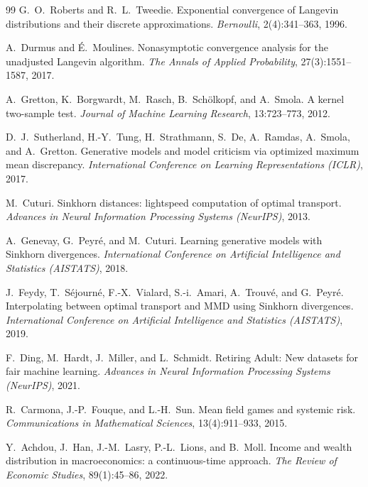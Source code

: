 \documentclass[11pt, a4paper]{article}
\theoremstyle{definition}
\begin{document}
\begin{thebibliography}{99}
G.~O.~Roberts and R.~L.~Tweedie.
\newblock Exponential convergence of Langevin distributions and their
discrete approximations.
\newblock \emph{Bernoulli}, 2(4):341--363, 1996.

A.~Durmus and \'E.~Moulines.
\newblock Nonasymptotic convergence analysis for the unadjusted Langevin
algorithm.
\newblock \emph{The Annals of Applied Probability}, 27(3):1551--1587,
2017.

A.~Gretton, K.~Borgwardt, M.~Rasch, B.~Sch\"olkopf, and A.~Smola.
\newblock A kernel two-sample test.
\newblock \emph{Journal of Machine Learning Research}, 13:723--773, 2012.

D.~J.~Sutherland, H.-Y.~Tung, H.~Strathmann, S.~De, A.~Ramdas,
A.~Smola, and A.~Gretton.
\newblock Generative models and model criticism via optimized
maximum mean discrepancy.
\newblock \emph{International Conference on Learning Representations
(ICLR)}, 2017.

M.~Cuturi.
\newblock Sinkhorn distances: lightspeed computation of optimal transport.
\newblock \emph{Advances in Neural Information Processing Systems
(NeurIPS)}, 2013.

A.~Genevay, G.~Peyr\'e, and M.~Cuturi.
\newblock Learning generative models with Sinkhorn divergences.
\newblock \emph{International Conference on Artificial Intelligence
and Statistics (AISTATS)}, 2018.

J.~Feydy, T.~S\'ejourn\'e, F.-X.~Vialard, S.-i.~Amari, A.~Trouv\'e,
and G.~Peyr\'e.
\newblock Interpolating between optimal transport and MMD using
Sinkhorn divergences.
\newblock \emph{International Conference on Artificial Intelligence
and Statistics (AISTATS)}, 2019.

F.~Ding, M.~Hardt, J.~Miller, and L.~Schmidt.
\newblock Retiring Adult: New datasets for fair machine learning.
\newblock \emph{Advances in Neural Information Processing Systems
(NeurIPS)}, 2021.

R.~Carmona, J.-P.~Fouque, and L.-H.~Sun.
\newblock Mean field games and systemic risk.
\newblock \emph{Communications in Mathematical Sciences},
13(4):911--933, 2015.

Y.~Achdou, J.~Han, J.-M.~Lasry, P.-L.~Lions, and B.~Moll.
\newblock Income and wealth distribution in macroeconomics: a
continuous-time approach.
\newblock \emph{The Review of Economic Studies}, 89(1):45--86, 2022.

\end{thebibliography}
\end{document}

